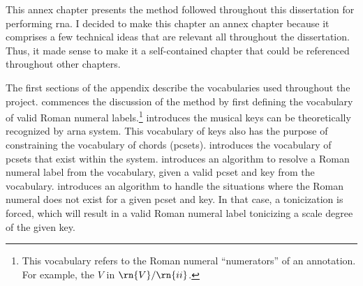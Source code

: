 
This annex chapter presents the method followed throughout
this dissertation for performing \gls{rna}. I decided to
make this chapter an annex chapter because it comprises a
few technical ideas that are relevant all throughout the
dissertation. Thus, it made sense to make it a
self-contained chapter that could be referenced throughout
other chapters.

The first sections of the appendix describe the vocabularies
used throughout the project.
 commences the
discussion of the method by first defining the vocabulary of
valid Roman numeral labels.\footnote{This vocabulary refers
to the Roman numeral ``numerators'' of an annotation. For
example, the $V$ in $\rn{V}/\rn{ii}$.}
 introduces the musical
keys can be theoretically recognized by \gls{arna} system.
This vocabulary of keys also has the purpose of constraining
the vocabulary of chords (\gls{pcset}s).
 introduces the
vocabulary of \gls{pcset}s that exist within the system.
introduces an algorithm to resolve a Roman numeral label
from the vocabulary, given a valid \gls{pcset} and key from
the vocabulary. 
introduces an algorithm to handle the situations where the
Roman numeral does not exist for a given \gls{pcset} and
key. In that case, a tonicization is forced, which will
result in a valid Roman numeral label tonicizing a scale
degree of the given key.
